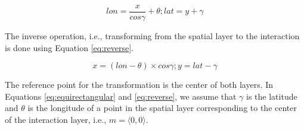\begin{equation}\label{eq:equirectangular}
\mathit{lon} = \frac{x}{\mathit{cos}\gamma} + \theta; \mathit{lat} = y + \gamma 
\end{equation}

The inverse operation, i.e., transforming from the spatial layer to the interaction is done using Equation \ref{eq:reverse}.

\begin{equation}\label{eq:reverse}
x = (\mathit{lon} - \theta) \times \mathit{cos}\gamma; y = \mathit{lat} - \gamma
\end{equation}

\vspace{2pt}
The reference point for the transformation is the center of both layers. In Equations \ref{eq:equirectangular} and \ref{eq:reverse}, we assume that $\gamma$ is the latitude and $\theta$ is the longitude of a point in the spatial layer corresponding to the center of the interaction layer, i.e., $m= \langle 0,0 \rangle$.
